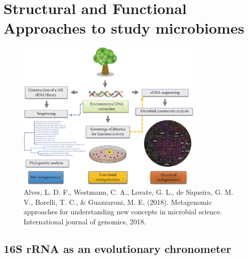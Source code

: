 \documentclass[
]{book}
\begin{document}
\hypertarget{structural-and-functional-approaches-to-study-microbiomes}{%
\section{Structural and Functional Approaches to study microbiomes}\label{structural-and-functional-approaches-to-study-microbiomes}}

\begin{figure}
\centering
\includegraphics[width=0.8\textwidth,height=\textheight]{./Figures/StructureFunction.png}
\caption{Alves, L. D. F., Westmann, C. A., Lovate, G. L., de Siqueira, G. M. V., Borelli, T. C., \& Guazzaroni, M. E. (2018). Metagenomic approaches for understanding new concepts in microbial science. International journal of genomics, 2018.}
\end{figure}

\hypertarget{s-rrna-as-an-evolutionary-chronometer}{%
\subsection{16S rRNA as an evolutionary chronometer}\label{s-rrna-as-an-evolutionary-chronometer}}
\end{document}
